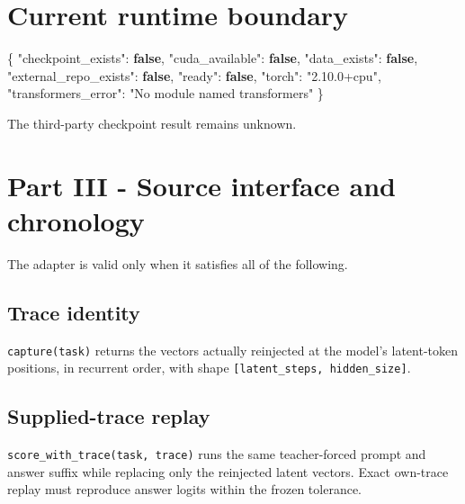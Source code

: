 \documentclass[
  10pt,
]{article}
\newenvironment{Shaded}{}{}
\newcommand{\DataTypeTok}[1]{\textcolor[rgb]{0.56,0.13,0.00}{#1}}
\newcommand{\FunctionTok}[1]{\textcolor[rgb]{0.02,0.16,0.49}{#1}}
\newcommand{\KeywordTok}[1]{\textcolor[rgb]{0.00,0.44,0.13}{\textbf{#1}}}
\newcommand{\StringTok}[1]{\textcolor[rgb]{0.25,0.44,0.63}{#1}}
\begin{document}
\section{Current runtime boundary}\label{current-runtime-boundary}

\begin{Shaded}
\begin{Highlighting}[]
\FunctionTok{\{}
  \DataTypeTok{"checkpoint\_exists"}\FunctionTok{:} \KeywordTok{false}\FunctionTok{,}
  \DataTypeTok{"cuda\_available"}\FunctionTok{:} \KeywordTok{false}\FunctionTok{,}
  \DataTypeTok{"data\_exists"}\FunctionTok{:} \KeywordTok{false}\FunctionTok{,}
  \DataTypeTok{"external\_repo\_exists"}\FunctionTok{:} \KeywordTok{false}\FunctionTok{,}
  \DataTypeTok{"ready"}\FunctionTok{:} \KeywordTok{false}\FunctionTok{,}
  \DataTypeTok{"torch"}\FunctionTok{:} \StringTok{"2.10.0+cpu"}\FunctionTok{,}
  \DataTypeTok{"transformers\_error"}\FunctionTok{:} \StringTok{"No module named \textquotesingle{}transformers\textquotesingle{}"}
\FunctionTok{\}}
\end{Highlighting}
\end{Shaded}

The third-party checkpoint result remains unknown.

\section{Part III - Source interface and
chronology}\label{part-iii---source-interface-and-chronology}

The adapter is valid only when it satisfies all of the following.

\subsection{Trace identity}\label{trace-identity}

\texttt{capture(task)} returns the vectors actually reinjected at the
model's latent-token positions, in recurrent order, with shape
\texttt{{[}latent\_steps,\ hidden\_size{]}}.

\subsection{Supplied-trace replay}\label{supplied-trace-replay}

\texttt{score\_with\_trace(task,\ trace)} runs the same teacher-forced
prompt and answer suffix while replacing only the reinjected latent
vectors. Exact own-trace replay must reproduce answer logits within the
frozen tolerance.
\end{document}
